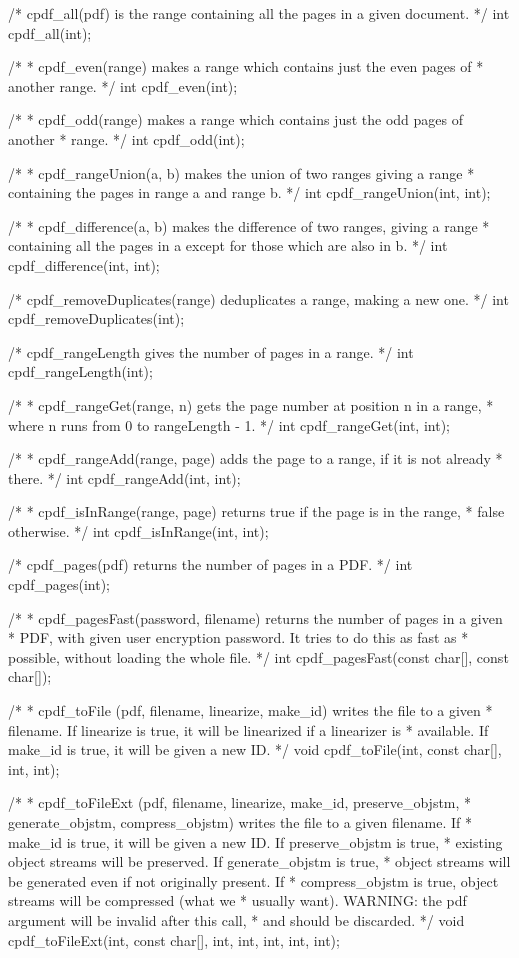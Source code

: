 /* cpdf_all(pdf) is the range containing all the pages in a given document. */
int cpdf_all(int);

/*
 * cpdf_even(range) makes a range which contains just the even pages of
 * another range.
 */
int cpdf_even(int);

/*
 * cpdf_odd(range) makes a range which contains just the odd pages of another
 * range.
 */
int cpdf_odd(int);

/*
 * cpdf_rangeUnion(a, b) makes the union of two ranges giving a range
 * containing the pages in range a and range b.
 */
int cpdf_rangeUnion(int, int);

/*
 * cpdf_difference(a, b) makes the difference of two ranges, giving a range
 * containing all the pages in a except for those which are also in b.
 */
int cpdf_difference(int, int);

/* cpdf_removeDuplicates(range) deduplicates a range, making a new one. */
int cpdf_removeDuplicates(int);

/* cpdf_rangeLength gives the number of pages in a range. */
int cpdf_rangeLength(int);

/*
 * cpdf_rangeGet(range, n) gets the page number at position n in a range,
 * where n runs from 0 to rangeLength - 1.
 */
int cpdf_rangeGet(int, int);

/*
 * cpdf_rangeAdd(range, page) adds the page to a range, if it is not already
 * there.
 */
int cpdf_rangeAdd(int, int);

/*
 * cpdf_isInRange(range, page) returns true if the page is in the range,
 * false otherwise.
 */
int cpdf_isInRange(int, int);

/* cpdf_pages(pdf) returns the number of pages in a PDF. */
int cpdf_pages(int);

/*
 * cpdf_pagesFast(password, filename) returns the number of pages in a given
 * PDF, with given user encryption password. It tries to do this as fast as
 * possible, without loading the whole file.
 */
int cpdf_pagesFast(const char[], const char[]);

/*
 * cpdf_toFile (pdf, filename, linearize, make_id) writes the file to a given
 * filename. If linearize is true, it will be linearized if a linearizer is
 * available. If make_id is true, it will be given a new ID.
 */
void cpdf_toFile(int, const char[], int, int);

/*
 * cpdf_toFileExt (pdf, filename, linearize, make_id, preserve_objstm,
 * generate_objstm, compress_objstm) writes the file to a given filename. If
 * make_id is true, it will be given a new ID.  If preserve_objstm is true,
 * existing object streams will be preserved. If generate_objstm is true,
 * object streams will be generated even if not originally present. If
 * compress_objstm is true, object streams will be compressed (what we
 * usually want). WARNING: the pdf argument will be invalid after this call,
 * and should be discarded.
 */
void cpdf_toFileExt(int, const char[], int, int, int, int, int);

